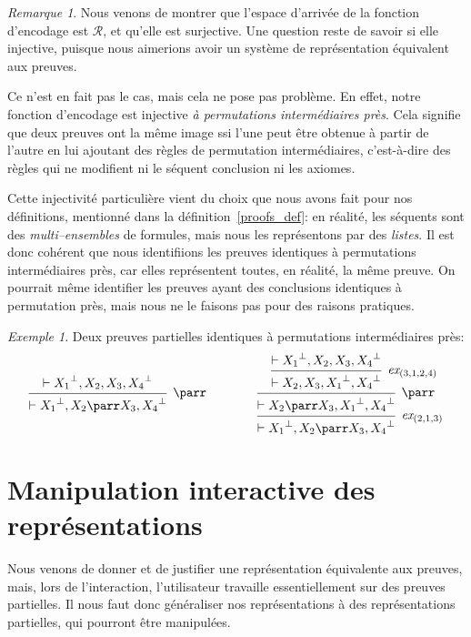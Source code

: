 \documentclass[11pt,a4paper]{article}
\theoremstyle{plain}
\theoremstyle{definition}
\theoremstyle{remark}
\newtheorem{remark}{Remarque}
\newtheorem{example}{Exemple}
\newcommand*{\orth}{^\perp}
\newcommand*{\hypv}[1]{\hypo{\vdash #1}}
\newcommand*{\parrv}[1]{\infer{1}[\ensuremath{\parr}]{\vdash #1}}
\newcommand*{\permv}[2]{\infer{1}[\ensuremath{\textit{ex}_{#1}}]{\vdash #2}}
\newcommand*{\representations}{\ensuremath{\mathcal{R}}}
\begin{document}
\begin{remark}
    \label{remark_kernel}
    Nous venons de montrer que l'espace d'arrivée de la fonction d'encodage est $\representations$, et qu'elle est surjective. Une question reste de savoir si elle injective, puisque nous aimerions avoir un système de représentation équivalent aux preuves.

    Ce n'est en fait pas le cas, mais cela ne pose pas problème. En effet, notre fonction d'encodage est injective \textit{à permutations intermédiaires près}. Cela signifie que deux preuves ont la même image ssi l'une peut être obtenue à partir de l'autre en lui ajoutant des règles de permutation intermédiaires, c'est-à-dire des règles qui ne modifient ni le séquent conclusion ni les axiomes.

    Cette injectivité particulière vient du choix que nous avons fait pour nos définitions, mentionné dans la définition~\ref{proofs_def}: en réalité, les séquents sont des \textit{multi--ensembles} de formules, mais nous les représentons par des \textit{listes}. Il est donc cohérent que nous identifiions les preuves identiques à permutations intermédiaires près, car elles représentent toutes, en réalité, la même preuve. On pourrait même identifier les preuves ayant des conclusions identiques à permutation près, mais nous ne le faisons pas pour des raisons pratiques.

    \begin{example}Deux preuves partielles identiques à permutations intermédiaires près:
        \begin{equation*}
            \begin{prooftree}
               \hypv{{X_1}\orth, X_2, X_3, {X_4}\orth}
               \parrv{{X_1}\orth, X_2 \parr X_3, {X_4}\orth}
            \end{prooftree}
\qquad\qquad
             \begin{prooftree}
               \hypv{{X_1}\orth, X_2, X_3, {X_4}\orth}
               \permv{(3, 1, 2, 4)}{X_2, X_3, {X_1}\orth, {X_4}\orth}
               \parrv{X_2 \parr X_3, {X_1}\orth, {X_4}\orth}
               \permv{(2, 1, 3)}{{X_1}\orth, X_2 \parr X_3, {X_4}\orth}
            \end{prooftree}
        \end{equation*}
    \end{example}
\end{remark}


\section{Manipulation interactive des représentations}
Nous venons de donner et de justifier une représentation équivalente aux preuves, mais, lors de l'interaction, l'utilisateur travaille essentiellement sur des preuves partielles. Il nous faut donc généraliser nos représentations à des représentations partielles, qui pourront être manipulées.
\end{document}
